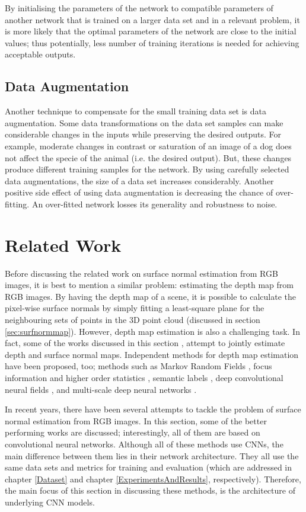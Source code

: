 By initialising the parameters of the network to compatible parameters of another network that is trained on a larger data set and in a relevant problem, it is more likely that the optimal parameters of the network are close to the initial values; thus potentially, less number of training iterations is needed for achieving acceptable outputs.

\subsection{Data Augmentation}

Another technique to compensate for the small training data set is data augmentation. Some data transformations on the data set samples can make considerable changes in the inputs while preserving the desired outputs. For example, moderate changes in contrast or saturation of an image of a dog does not affect the specie of the animal (i.e. the desired output). But, these changes produce different training samples for the network. By using carefully selected data augmentations, the size of a data set increases considerably. Another positive side effect of using data augmentation is decreasing the chance of over-fitting. An over-fitted network losses its generality and robustness to noise.   

\section{Related Work} \label{sec:relatedwork}

Before discussing the related work on surface normal estimation from RGB images, it is best to mention a similar problem: estimating the depth map from RGB images. By having the depth map of a scene, it is possible to calculate the pixel-wise surface normals by simply fitting a least-square plane for the neighbouring sets of points in the 3D point cloud (discussed in section \ref{sec:surfnormmap}). However, depth map estimation is also a challenging task. In fact, some of the works discussed in this section \cite{eigen,dharmasiri}, attempt to jointly estimate depth and surface normal maps. Independent methods for depth map estimation have been proposed, too; methods such as Markov Random Fields \cite{saxena}, focus information and higher order statistics \cite{jaeseung}, semantic labels \cite{liusemantic}, deep convolutional neural fields \cite{liucnf}, and multi-scale deep neural networks \cite{eigendepth}.     

In recent years, there have been several attempts to tackle the problem of surface normal estimation from RGB images. In this section, some of the better performing works are discussed; interestingly, all of them are based on convolutional neural networks. Although all of these methods use CNNs, the main difference between them lies in their network architecture. They all use the same data sets and metrics for training and evaluation (which are addressed in chapter \ref{Dataset} and chapter \ref{ExperimentsAndResults}, respectively). Therefore, the main focus of this section in discussing these methods, is the architecture of underlying CNN models.

